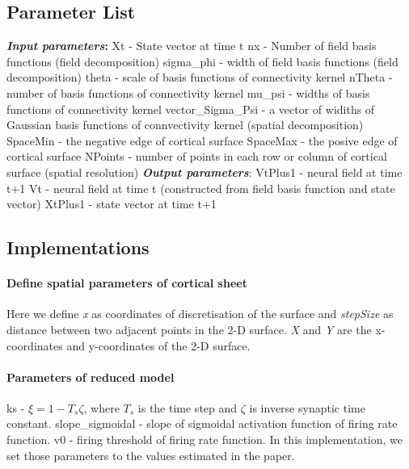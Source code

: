 \documentclass[a4paper, 12pt, english]{article}
\begin{document}
\subsection{Parameter List}
\textbf{\textit{Input parameters}:}\newline
Xt - State vector at time t\newline
nx - Number of field basis functions (field decomposition)\newline
sigma\_phi - width of field basis functions (field decomposition)\newline
theta - scale of basis functions of connectivity kernel\newline
nTheta - number of basis functions of connectivity kernel\newline
mu\_psi - widths of basis functions of connectivity kernel\newline
vector\_Sigma\_Psi - a vector of widiths of Gaussian basis functions of
connvectivity kernel (spatial decomposition)\newline
SpaceMin - the negative edge of cortical surface\newline
SpaceMax - the posive edge of cortical surface\newline
NPoints - number of points in each row or column of cortical
surface (spatial resolution)\newline
\textbf{\textit{Output parameters}}:\newline
VtPlus1 - neural field at time t+1\newline
Vt - neural field at time t
(constructed from field basis function and state vector)\newline
XtPlus1 - state vector at time t+1\newline
\subsection{Implementations}

\paragraph{Define spatial parameters of cortical sheet\newline}
Here we define \textit{x} as coordinates of discretisation of the surface and
\textit{stepSize} as distance between two adjacent points in the 2-D surface.
\textit{X} and \textit{Y} are the x-coordinates and y-coordinates of the 2-D surface.

\paragraph{Parameters of reduced model\newline}
ks - $\xi = 1 - T_s\zeta $, where $T_s$ is the time step and $\zeta $ is inverse synaptic time constant. \newline
slope\_sigmoidal - slope of sigmoidal activation function of firing rate function.\newline
v0 - firing threshold of firing rate function.\newline
In this implementation, we set those parameters to the values estimated in the paper.
\end{document}
